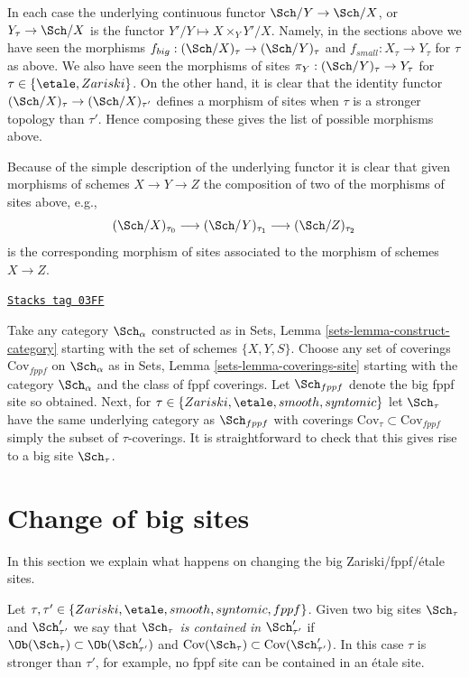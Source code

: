In each case the underlying continuous functor
$\Sch/Y \to \Sch/X$, or
$Y_\tau \to \Sch/X$
is the functor $Y'/Y \mapsto X \times_Y Y'/X$. Namely, in the sections
above we have seen the morphisms
$f_{big} : (\Sch/X)_\tau \to (\Sch/Y)_\tau$
and
$f_{small} : X_\tau \to Y_\tau$
for $\tau$ as above.
We also have seen the morphisms of sites
$\pi_Y : (\Sch/Y)_\tau \to Y_\tau$ for
$\tau \in \{\etale, Zariski\}$.
On the other hand, it is clear that the identity functor
$(\Sch/X)_\tau \to (\Sch/X)_{\tau'}$ defines
a morphism of sites when $\tau$ is a stronger topology than
$\tau'$. Hence composing these gives the list of possible morphisms
above.

\medskip\noindent
Because of the simple description of the underlying functor it
is clear that given morphisms of schemes $X \to Y \to Z$ the
composition of two of the morphisms of sites above, e.g.,
$$
(\Sch/X)_{\tau_0} \longrightarrow
(\Sch/Y)_{\tau_1} \longrightarrow
(\Sch/Z)_{\tau_2}
$$
is the corresponding morphism of sites associated to the morphism
of schemes $X \to Z$.

\begin{remark}
\label{topologies-remark-choice-sites}
\href{https://stacks.math.columbia.edu/tag/03FF}{\texttt{Stacks tag 03FF}}

Take any category $\Sch_\alpha$ constructed as in
Sets, Lemma \ref{sets-lemma-construct-category}
starting with the set of schemes $\{X, Y, S\}$. Choose any set of
coverings $\text{Cov}_{fppf}$ on $\Sch_\alpha$ as in
Sets, Lemma \ref{sets-lemma-coverings-site}
starting with the category $\Sch_\alpha$ and the class of fppf
coverings. Let $\Sch_{fppf}$ denote the big fppf site so
obtained. Next, for $\tau \in \{Zariski, \etale, smooth, syntomic\}$
let $\Sch_\tau$ have the same underlying category as
$\Sch_{fppf}$ with coverings
$\text{Cov}_\tau \subset \text{Cov}_{fppf}$ simply the subset of
$\tau$-coverings. It is straightforward to check that this gives rise
to a big site $\Sch_\tau$.
\end{remark}

\section{Change of big sites}
\label{topologies-section-change-alpha}
In this section we explain what happens on changing the big
Zariski/fppf/\'etale sites.

\medskip\noindent
Let $\tau, \tau' \in \{Zariski, \etale, smooth, syntomic, fppf\}$.
Given two big sites $\Sch_\tau$ and $\Sch'_{\tau'}$
we say that
{\it $\Sch_\tau$ is contained in $\Sch'_{\tau'}$} if
$\Ob(\Sch_\tau) \subset \Ob(\Sch'_{\tau'})$
and
$\text{Cov}(\Sch_\tau) \subset \text{Cov}(\Sch'_{\tau'})$.
In this case $\tau$ is stronger than $\tau'$, for example, no fppf
site can be contained in an \'etale site.

